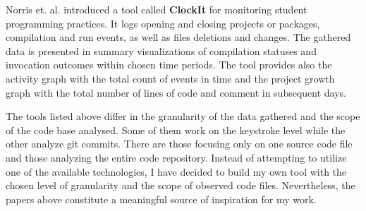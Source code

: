 Norris et. al. \cite{Nor08ClockIt} introduced a tool called \textbf{ClockIt} for monitoring student programming practices. It logs opening and closing projects or packages, compilation and run events, as well as files deletions and changes. The gathered data is presented in summary visualizations of compilation statuses and invocation outcomes within chosen time periods. The tool provides also the activity graph with the total count of events in time and the project growth graph with the total number of lines of code and comment in subsequent days.

The tools listed above differ in the granularity of the data gathered and the scope of the code base analysed. Some of them work on the keystroke level while the other analyze git commits. There are those focusing only on one source code file and those analyzing the entire code repository. Instead of attempting to utilize one of the available technologies, I have decided to build my own tool with the chosen level of granularity and the scope of observed code files. Nevertheless, the papers above constitute a meaningful source of inspiration for my work.



